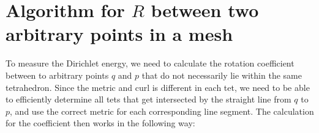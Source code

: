 \documentclass[../thesis.tex]{subfiles}
\begin{document}
\newcommand{\str}[1]{\textsc{#1}}
\newcommand{\var}[1]{\textit{#1}}
\newcommand{\op}[1]{\textsl{#1}}
\def \ifempty#1{\def\temp{#1} \ifx\temp\empty }
\newcommand{\msg}[2]{\ensuremath{\ifempty{#2} [\str{#1}] \else [\str{#1}, {#2}] \fi}}
\newcommand{\tup}[1]{\ensuremath{\langle #1 \rangle}}
\newcommand{\nil}{\ensuremath{\bot}}
\newcommand{\false}{\textsc{false}\xspace}
\newcommand{\true}{\textsc{true}\xspace}

\newcommand\lastts{\var{lastts}\xspace}
\newcommand\nextts{\var{nextts}\xspace}
\newcommand\trusted{\var{trusted}\xspace}
\newcommand\newepoch{\var{newepoch}\xspace}
\newcommand\leader{\var{leader}\xspace}
\newcommand\ts{\var{ts}\xspace}
\newcommand{\CK}{\ensuremath{\mathcal{K}}\xspace}
\newcommand{\CP}{\ensuremath{\mathcal{P}}\xspace}
\newcommand{\CQ}{\ensuremath{\mathcal{Q}}\xspace}

\chapter{Algorithm for $R$ between two arbitrary points in a mesh}
\label{ch:algorithm}
To measure the Dirichlet energy, we need to calculate the rotation coefficient
between to arbitrary points $q$ and $p$ that do not necessarily lie within the same 
tetrahedron. Since the metric and curl is different in each tet, we need to be
able to efficiently determine all tets that get intersected by the straight
line from $q$ to $p$, and use the correct metric for each corresponding
line segment.
The calculation for the coefficient then works in the following way:
\end{document}
